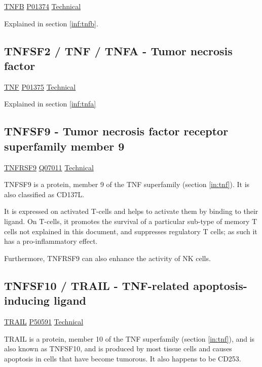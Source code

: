 \href{https://en.wikipedia.org/wiki/Lymphotoxin \textunderscore alpha}{TNFB}
\href{http://www.uniprot.org/uniprot/P01374}{P01374}
\href{https://olink.com/products-services/target/protein/?assayID=5111}{Technical}

Explained in section \ref{inf:tnfb}.

\subsection{TNFSF2 / TNF / TNFA - Tumor necrosis factor}

\href{https://en.wikipedia.org/wiki/Tumor \textunderscore necrosis \textunderscore factor}{TNF}
\href{http://www.uniprot.org/uniprot/P01375}{P01375}
\href{https://olink.com/products-services/target/protein/?assayID=5099}{Technical}

Explained in section \ref{inf:tnfa}

\subsection{TNFSF9 - Tumor necrosis factor receptor superfamily member 9}

\href{https://en.wikipedia.org/wiki/4-1BB \textunderscore ligand}{TNFRSF9}
\href{http://www.uniprot.org/uniprot/Q07011}{Q07011}
\href{https://olink.com/products-services/target/protein/?assayID=5128}{Technical}

TNFSF9 is a protein, member 9 of the TNF superfamily (section \ref{in:tnf}). It is also classified as CD137L.

It is expressed on activated T-cells and helps to activate them by binding to their ligand. On T-cells, it promotes the survival of a particular sub-type of memory T cells not explained in this document, and suppresses regulatory T cells; as such it has a pro-inflammatory effect.

Furthermore, TNFRSF9 can also enhance the activity of NK cells.



\subsection{TNFSF10 / TRAIL - TNF-related apoptosis-inducing ligand}

\href{https://en.wikipedia.org/wiki/TRAIL}{TRAIL}
\href{http://www.uniprot.org/uniprot/P50591}{P50591}
\href{https://olink.com/products-services/target/protein/?assayID=5079}{Technical}

TRAIL is a protein, member 10 of the TNF superfamily (section \ref{in:tnf}), and is also known as TNFSF10, and is produced by most tissue cells and causes apoptosis in cells that have become tumorous. It also happens to be CD253.

